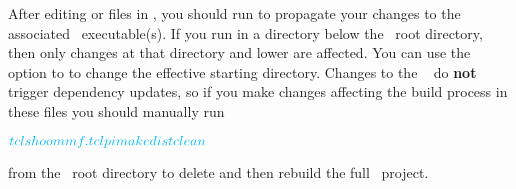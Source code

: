 After editing  or  files in \OOMMF, you should run
 to propagate your changes to the associated
\OOMMF\ executable(s).  If you run  in a
directory below the \OOMMF\ root directory, then only changes at that
directory and lower are affected. You can use the  option to
 to change the effective starting directory. Changes to the
\OOMMF\  do \textbf{not} trigger dependency
updates, so if you make changes affecting the build process in these
files you should manually run
\begin{alltt}
$ \shellcmd{tclsh oommf.tcl pimake distclean}
$ 
\end{alltt}\html{\newline}
from the \OOMMF\ root directory to delete and then rebuild the full
\OOMMF\ project.

